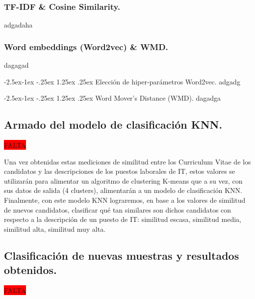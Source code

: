 \documentclass[12pt,a4paper]{article}
\makeatletter
\renewcommand\paragraph{\@startsection{paragraph}{4}{\z@}
            {-2.5ex\@plus -1ex \@minus -.25ex}
            {1.25ex \@plus .25ex}
            {\normalfont\normalsize\bfseries}}
\makeatother
\begin{document}
\begin{sloppypar}
\cleardoublepage

\subsubsection{TF-IDF \& Cosine Similarity.}
adgadaha
\cleardoublepage

\subsubsection{Word embeddings (Word2vec) \& WMD.}\label{Implementacion_word_emb_y_wmd}
dagagad
\cleardoublepage

\paragraph{Elección de hiper-parámetros Word2vec.}\label{hiper_par_word2vec}
adgadg
\cleardoublepage

\paragraph{Word Mover's Distance (WMD).}
dagadga
\cleardoublepage


\subsection{Armado del modelo de clasificación KNN.}\label{IMP_Modelo_clasificacion_KNN}
\colorbox{red}{FALTA}

Una vez obtenidas estas mediciones de similitud entre los Curriculum Vitae de los candidatos y las descripciones de los puestos laborales de IT, estos valores se utilizarán para alimentar un algoritmo de clustering K-means que a su vez, con sus datos de salida (4 clusters), alimentarán a un modelo de clasificación KNN. Finalmente, con este modelo KNN lograremos, en base a los valores de similitud de nuevos candidatos, clasificar qué tan similares son dichos candidatos con respecto a la descripción de un puesto de IT: similitud escasa, similitud media, similitud alta, similitud muy alta.

\cleardoublepage

\subsection{Clasificación de nuevas muestras y resultados obtenidos.}\label{5.4.Predicciondenuevasmuestrasyresultadosobtenidos}

\colorbox{red}{FALTA}


\end{sloppypar}
\end{document}
